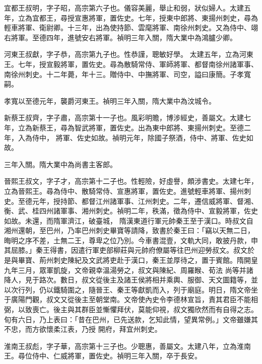 \begin{pinyinscope}
 宜都王叔明，字子昭，高宗第六子也。儀容美麗，舉止和弱，狀似婦人。太建五年，立為宜都王，尋授宣惠將軍，置佐史。七年，授東中郎將、東揚州刺史，尋為輕車將軍、衛尉卿。十三年，出為使持節、雲麾將軍、南徐州刺史。又為侍中、翊右將軍。至德四年，進號安右將軍。禎明三年入關，隋大業中為鴻臚少卿。



 河東王叔獻，字子恭，高宗第九子也。性恭謹，聰敏好學。
 太建五年，立為河東王。七年，授宣毅將軍，置佐史。尋為散騎常侍、軍師將軍、都督南徐州諸軍事、南徐州刺史。十二年薨，年十三。贈侍中、中撫將軍、司空，謚曰康簡。子孝寬嗣。



 孝寬以至德元年，襲爵河東王。禎明三年入關，隋大業中為汶城令。



 新蔡王叔齊，字子肅，高宗第十一子也。風彩明贍，博涉經史，善屬文。太建七年，立為新蔡王，尋為智武將軍，置佐史。出為東中郎將、東揚州刺史。至德二年，入為侍中，
 將軍、佐史如故。禎明元年，除國子祭酒，侍中、將軍、佐史如故。



 三年入關。隋大業中為尚書主客郎。



 晉熙王叔文，字子才，高宗第十二子也。性輕險，好虛譽，頗涉書史。太建七年，立為晉熙王。尋為侍中、散騎常侍、宣惠將軍，置佐史。進號輕車將軍、揚州刺史。至德元年，授持節、都督江州諸軍事、江州刺史。二年，遷信威將軍、督湘、衡、武、桂四州諸軍事、湘州刺史。禎明二年，秩滿，徵為侍中、宣毅將軍，佐史如故。未還，而隋軍濟江，破臺城，
 隋漢東道行軍元帥秦王至于漢口。時叔文自湘州還朝，至巴州，乃率巴州刺史畢寶等請降，致書於秦王曰：「竊以天無二日，晦明之序不差，土無二王，尊卑之位乃別。今車書混壹，文軌大同，敢披丹款，申其屈膝。」秦王得書，因遣行軍吏部柳莊與元帥府僚屬等往巴州迎勞叔文。叔文於是與畢寶、荊州刺史陳紀及文武將吏赴于漢口，秦王並厚待之，置于賓館。隋開皇九年三月，眾軍凱旋，文帝親幸溫湯勞之，叔文與陳紀、周羅睺、荀法
 尚等并諸降人，見于路次。數日，叔文從後主及諸王侯將相并乘輿、服御、天文圖籍等，並以次行列，仍以鐵騎圍之，隨晉王、秦王等獻凱而入，列于廟庭。明日，隋文帝坐于廣陽門觀，叔文又從後主至朝堂南。文帝使內史令李德林宣旨，責其君臣不能相弼，以致喪亡。後主與其群臣並慚懼拜伏，莫能仰視，叔文獨欣然而有自得之志。旬有六日，乃上表曰：「昔在巴州，已先送款，乞知此情，望異常例。」文帝雖嫌其不忠，而方欲懷柔江表，乃授
 開府，拜宜州刺史。



 淮南王叔彪，字子華，高宗第十三子也。少聰惠，善屬文。太建八年，立為淮南王。尋位侍中、仁威將軍，置佐史。禎明三年入關，卒于長安。




\end{pinyinscope}
